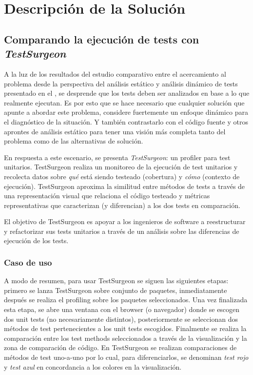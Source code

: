 \chapter{Descripción de la Solución}




\section{Comparando la ejecución de tests con \emph{TestSurgeon}}

\par A la luz de los resultados del estudio comparativo entre el acercamiento al problema desde la perspectiva del análisis estático y análisis dinámico de  tests presentado en el , se desprende que los tests deben ser analizados en base a lo que realmente ejecutan. Es por esto que se hace necesario que cualquier solución que apunte a abordar este problema, considere fuertemente un enfoque dinámico para el diagnóstico de la situación. Y también contrastarlo con el código fuente y otros aprontes de análisis estático para tener una visión más completa tanto del problema como de las alternativas de solución. 

\par En respuesta a este escenario, se presenta \emph{TestSurgeon}: un profiler para test unitarios. TestSurgeon realiza un monitoreo de la ejecución de test unitarios y recolecta datos sobre \emph{qué} está siendo testeado (cobertura) y \emph{cómo} (contexto de ejecución). TestSurgeon aproxima la similitud entre métodos de tests a través de una representación visual que relaciona el código testeado y métricas representativas que caracterizan (y diferencian) a los dos tests en comparación. 

\par El objetivo de TestSurgeon es apoyar a los ingenieros de software a reestructurar y refactorizar sus tests unitarios a través de un análisis sobre las diferencias de ejecución de los tests.

\subsection{Caso de uso}
\par A modo de resumen, para usar TestSurgeon se siguen las siguientes etapas: primero se lanza TestSurgeon sobre conjunto de paquetes, inmediatamente después se realiza el profiling sobre los paquetes seleccionados. Una vez finalizada esta etapa, se abre una ventana con el browser (o navegador) donde se escogen dos unit tests (no necesariamente distintos), posteriormente se seleccionan dos métodos de test pertenecientes a los unit tests escogidos. Finalmente se realiza la comparación entre los test methods seleccionados a través de la visualización y la zona de comparación de código. En TestSurgeon se realizan comparaciones de métodos de test uno-a-uno por lo cual, para diferenciarlos, se denominan \emph{test rojo} y \emph{test azul} en concordancia a los colores en la visualización.

